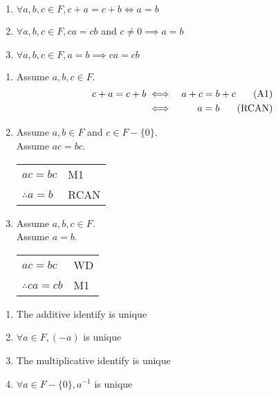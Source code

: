 \documentclass[letterpaper,12pt,fleqn]{article}
\begin{document}
\begin{theorem}
\listbreak
\begin{enumerate}
\item{$\forall a,b,c\in F, c+a=c+b\iff a=b$}
\item{$\forall a,b,c\in F, ca=cb$ and $c\ne0\implies a=b$}
\item{$\forall a,b,c\in F, a=b\implies ca=cb$}
\end{enumerate}
\end{theorem}

\begin{theproof}
\listbreak
\begin{enumerate}
\item{Assume $a,b,c\in F$.}
\begin{eqnarray*}
c+a=c+b &\iff& a+c=b+c\hspace{0.25in}\mbox{(A1)} \\
    &\iff& a=b\hspace{0.25in}\mbox{(RCAN)} \\
\end{eqnarray*}

\item{Assume $a,b\in F$ and $c\in F-\{0\}$.}
\\
Assume $ac=bc$.

\begin{tabular}{ll}
$ac=bc$ & M1 \\
$\therefore a=b$ & RCAN \\
\end{tabular}

\item{Assume $a,b,c\in F$}.
\\
Assume $a=b$.

\begin{tabular}{ll}
$ac=bc$ & WD \\
$\therefore ca=cb$ & M1 \\
\end{tabular}
\end{enumerate}
\end{theproof}

\begin{theorem}[Uniqueness]
\listbreak
\begin{enumerate}
\item{The additive identify is unique}
\item{$\forall a\in F, (-a)$ is unique}
\item{The multiplicative identify is unique}
\item{$\forall a\in F-\{0\}, a^{-1}$ is unique}
\end{enumerate}
\end{theorem}
\end{document}
